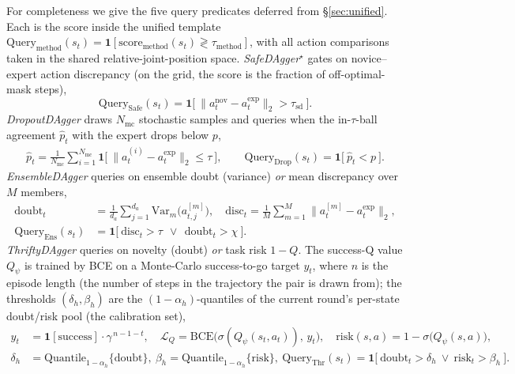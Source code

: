 \documentclass[letterpaper]{article} %
\begin{document}
For completeness we give the five query predicates deferred from
\S\ref{sec:unified}. Each is the score inside the unified template
$\mathrm{Query}_{\mathrm{method}}(s_t)=\mathbf{1}[\mathrm{score}_{\mathrm{method}}(s_t)\gtrless\tau_{\mathrm{method}}]$,
with all action comparisons taken in the shared relative-joint-position space.
\emph{SafeDAgger}$^\star$ \cite{zhang2017safedagger} gates on novice--expert action
discrepancy (on the grid, the score is the fraction of off-optimal-mask steps),
\begin{equation}
\mathrm{Query}_{\mathrm{Safe}}(s_t)=\mathbf{1}\big[\ \|a^{\mathrm{nov}}_t-a^{\mathrm{exp}}_t\|_2 > \tau_{\mathrm{sd}}\ \big].
\label{eq:safe}
\end{equation}
\emph{DropoutDAgger} \cite{menda2017dropoutdagger,gal2016dropout} draws
$N_{\mathrm{mc}}$ stochastic samples and queries when the in-$\tau$-ball agreement
$\hat p_t$ with the expert drops below $p$,
\begin{align}
\hat p_t=\tfrac{1}{N_{\mathrm{mc}}}\sum_{i=1}^{N_{\mathrm{mc}}}\mathbf{1}\big[\ \|a^{(i)}_t-a^{\mathrm{exp}}_t\|_2\le\tau\ \big],
\qquad
\mathrm{Query}_{\mathrm{Drop}}(s_t)=\mathbf{1}\big[\ \hat p_t<p\ \big].
\label{eq:dropout}
\end{align}
\emph{EnsembleDAgger} \cite{menda2019ensembledagger,lakshminarayanan2017ensembles}
queries on ensemble doubt (variance) \emph{or} mean discrepancy over $M$ members,
\begin{align}
\mathrm{doubt}_t&=\tfrac1{d_a}\!\sum_{j=1}^{d_a}\mathrm{Var}_{m}\big(a^{[m]}_{t,j}\big),
\quad
\mathrm{disc}_t=\tfrac1M\!\sum_{m=1}^{M}\big\|a^{[m]}_t-a^{\mathrm{exp}}_t\big\|_2, \nonumber\\
\mathrm{Query}_{\mathrm{Ens}}(s_t)&=\mathbf{1}\big[\ \mathrm{disc}_t>\tau\ \ \lor\ \ \mathrm{doubt}_t>\chi\ \big].
\label{eq:ensemble}
\end{align}
\emph{ThriftyDAgger} \cite{hoque2021thriftydagger} queries on novelty (doubt)
\emph{or} task risk $1-Q$. The success-Q value $Q_\psi$ is trained by BCE on a
Monte-Carlo success-to-go target $y_t$, where $n$ is the episode length (the number
of steps in the trajectory the pair is drawn from); the thresholds
$(\delta_h,\beta_h)$ are the $(1-\alpha_h)$-quantiles of the current round's
per-state doubt/risk pool (the calibration set),
\begin{align}
y_t&=\mathbf{1}[\mathrm{success}]\cdot\gamma^{\,n-1-t},
\quad
\mathcal{L}_Q=\mathrm{BCE}\big(\sigma(Q_\psi(s_t,a_t)),\,y_t\big),
\quad
\mathrm{risk}(s,a)=1-\sigma\!\big(Q_\psi(s,a)\big), \nonumber\\
\delta_h&=\mathrm{Quantile}_{1-\alpha_h}\{\mathrm{doubt}\},\
\beta_h=\mathrm{Quantile}_{1-\alpha_h}\{\mathrm{risk}\},\
\mathrm{Query}_{\mathrm{Thr}}(s_t)=\mathbf{1}\big[\ \mathrm{doubt}_t>\delta_h\ \lor\ \mathrm{risk}_t>\beta_h\ \big].
\label{eq:thrifty}
\end{align}
\end{document}
